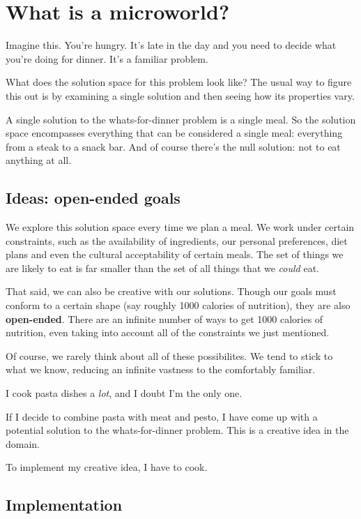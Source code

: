 \section{What is a microworld?}

Imagine this. You're hungry. It's late in the day and you need to
decide what you're doing for dinner. It's a familiar problem.

What does the solution space for this problem look like? The usual way to figure this out
is by examining a single solution and then seeing how its properties vary.

A single solution to the whats-for-dinner problem is a single meal. So
the solution space encompasses everything that can be considered a
single meal: everything from a steak to a snack bar. And of course
there's the null solution: not to eat anything at all.

\subsection{Ideas: open-ended goals}

We explore this solution space every time we plan a meal. We work under
certain constraints, such as the availability of ingredients, our personal preferences,
diet plans and even the cultural acceptability of certain meals. The
set of things we are likely to eat is far smaller than the set of all
things that we \emph{could} eat.

That said, we can also be creative with our solutions. Though our goals
must conform to a certain shape (say roughly 1000 calories of
nutrition), they are also \textbf{open-ended}. There are an infinite
number of ways to get 1000 calories of nutrition, even taking into
account all of the constraints we just mentioned.

Of course, we rarely think about all of these possibilites. We tend to
stick to what we know, reducing an infinite vastness to the comfortably
familiar.

I cook pasta dishes a \emph{lot}, and I doubt I'm the only one.

If I decide to combine pasta with meat and pesto, I have come up with a
potential solution to the whats-for-dinner problem. This is a
creative idea in the domain.

To implement my creative idea, I have to cook.

\subsection{Implementation}

